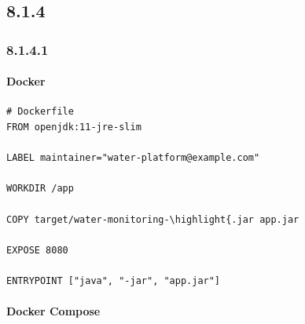 \hypertarget{section-49}{%
\subsection{8.1.4}\label{section-49}}

\hypertarget{section-50}{%
\subsubsection{8.1.4.1}\label{section-50}}

\hypertarget{docker}{%
\paragraph{Docker}\label{docker}}

\begin{lstlisting}
# Dockerfile
FROM openjdk:11-jre-slim

LABEL maintainer="water-platform@example.com"

WORKDIR /app

COPY target/water-monitoring-\highlight{.jar app.jar

EXPOSE 8080

ENTRYPOINT ["java", "-jar", "app.jar"]
\end{lstlisting}

\hypertarget{docker-compose}{%
\paragraph{Docker Compose}\label{docker-compose}}

